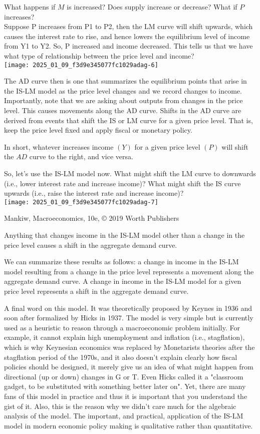 \documentclass[10pt]{article}
\begin{document}
What happens if $M$ is increased? Does supply increase or decrease? What if $P$ increases?\\
Suppose P increases from P1 to P2, then the LM curve will shift upwards, which causes the interest rate to rise, and hence lowers the equilibrium level of income from Y1 to Y2. So, P increased and income decreased. This tells us that we have what type of relationship between the price level and income?\\
\texttt{[image: 2025\_01\_09\_f3d9e345077fc1029adag-6]}

The AD curve then is one that summarizes the equilibrium points that arise in the IS-LM model as the price level changes and we record changes to income. Importantly, note that we are asking about outputs from changes in the price level. This causes movements along the AD curve. Shifts in the AD curve are derived from events that shift the IS or LM curve for a given price level. That is, keep the price level fixed and apply fiscal or monetary policy.

In short, whatever increases income $(Y)$ for a given price level $(P)$ will shift the $A D$ curve to the right, and vice versa.

So, let's use the IS-LM model now. What might shift the LM curve to downwards (i.e., lower interest rate and increase income)? What might shift the IS curve upwards (i.e., raise the interest rate and increase income)?\\
\texttt{[image: 2025\_01\_09\_f3d9e345077fc1029adag-7]}

Mankiw, Macroeconomics, 10e, © 2019 Worth Publishers

Anything that changes income in the IS-LM model other than a change in the price level causes a shift in the aggregate demand curve.

We can summarize these results as follows: a change in income in the IS-LM model resulting from a change in the price level represents a movement along the aggregate demand curve. A change in income in the IS-LM model for a given price level represents a shift in the aggregate demand curve.

A final word on this model. It was theoretically proposed by Keynes in 1936 and soon after formalized by Hicks in 1937. The model is very simple but is currently used as a heuristic to reason through a macroeconomic problem initially. For example, it cannot explain high unemployment and inflation (i.e., stagflation), which is why Keynesian economics was replaced by Monetarists theories after the stagflation period of the 1970s, and it also doesn't explain clearly how fiscal policies should be designed, it merely give us an idea of what might happen from directional (up or down) changes in G or T. Even Hicks called it a "classroom gadget, to be substituted with something better later on". Yet, there are many fans of this model in practice and thus it is important that you understand the gist of it. Also, this is the reason why we didn't care much for the algebraic analysis of the model. The important, and practical, application of the IS-LM model in modern economic policy making is qualitative rather than quantitative.
\end{document}
